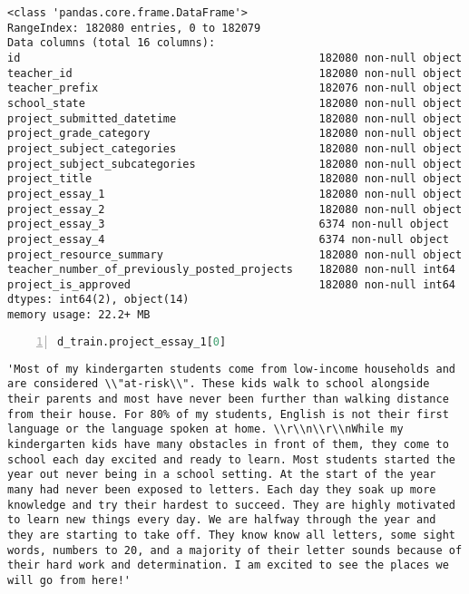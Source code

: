 \documentclass[10pt,parskip=half,
	toc=sectionentrywithdots,
	bibliography=totocnumbered,
	captions=tableheading,numbers=noendperiod]{scrartcl}
\begin{document}
\begin{lstlisting}[language={},postbreak={},numbers=none,xrightmargin=7pt,belowskip=5pt,aboveskip=5pt,breakindent=0pt]
<class 'pandas.core.frame.DataFrame'>
RangeIndex: 182080 entries, 0 to 182079
Data columns (total 16 columns):
id                                              182080 non-null object
teacher_id                                      182080 non-null object
teacher_prefix                                  182076 non-null object
school_state                                    182080 non-null object
project_submitted_datetime                      182080 non-null object
project_grade_category                          182080 non-null object
project_subject_categories                      182080 non-null object
project_subject_subcategories                   182080 non-null object
project_title                                   182080 non-null object
project_essay_1                                 182080 non-null object
project_essay_2                                 182080 non-null object
project_essay_3                                 6374 non-null object
project_essay_4                                 6374 non-null object
project_resource_summary                        182080 non-null object
teacher_number_of_previously_posted_projects    182080 non-null int64
project_is_approved                             182080 non-null int64
dtypes: int64(2), object(14)
memory usage: 22.2+ MB

\end{lstlisting}

\begin{lstlisting}[language=Python,numbers=left,xleftmargin=20pt,xrightmargin=5pt,belowskip=5pt,aboveskip=5pt]
d_train.project_essay_1[0]
\end{lstlisting}

\begin{lstlisting}[language={},postbreak={},numbers=none,xrightmargin=7pt,breakindent=0pt,aboveskip=5pt,belowskip=5pt]
'Most of my kindergarten students come from low-income households and are considered \\"at-risk\\". These kids walk to school alongside their parents and most have never been further than walking distance from their house. For 80% of my students, English is not their first language or the language spoken at home. \\r\\n\\r\\nWhile my kindergarten kids have many obstacles in front of them, they come to school each day excited and ready to learn. Most students started the year out never being in a school setting. At the start of the year many had never been exposed to letters. Each day they soak up more knowledge and try their hardest to succeed. They are highly motivated to learn new things every day. We are halfway through the year and they are starting to take off. They know know all letters, some sight words, numbers to 20, and a majority of their letter sounds because of their hard work and determination. I am excited to see the places we will go from here!'
\end{lstlisting}
\end{document}

